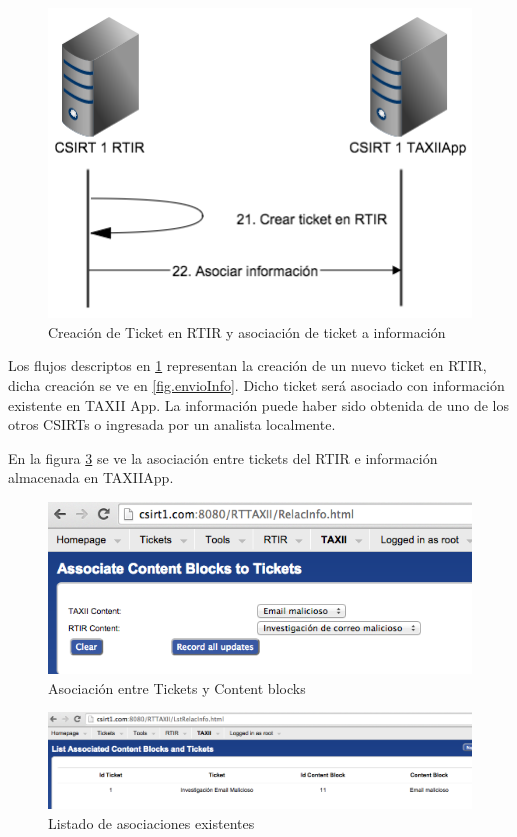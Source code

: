 \begin{figure}[H]
	\centering
	\includegraphics[scale=0.6]{flujos/flujo21-22.png}
	\caption{Creación de Ticket en RTIR y asociación de ticket a información}
	\label{fig.flujos2122}
\end{figure}

Los flujos descriptos en \ref{fig.flujos2122} representan la creación de un nuevo ticket en RTIR, dicha creación se ve en \ref{fig.envioInfo}. Dicho ticket será asociado con información existente en TAXII App. La información puede haber sido obtenida de uno de los otros CSIRTs o ingresada por un analista localmente.

En la figura \ref{fig.lstRelacInfo} se ve la asociación entre tickets del RTIR e información almacenada en TAXIIApp.

\begin{figure}[H]
	\centering
	\includegraphics[scale=0.4]{caso-de-estudio/relacInfo.png}
	\caption{Asociación entre Tickets y Content blocks}
	\label{fig.relacInfo}
\end{figure}

\begin{figure}[H]
	\centering
	\includegraphics[scale=0.4]{caso-de-estudio/lstRelacInfo.png}
	\caption{Listado de asociaciones existentes}
	\label{fig.lstRelacInfo}
\end{figure}

